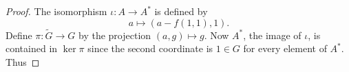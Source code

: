 \documentclass{dcthesis}
\newcommand{\mm}[1]{{\color{blue} \sf MM: [#1]}}
\newcommand{\wt}[1]{\widetilde{#1}}
\renewcommand{\ker}{\operatorname{ker}}
\numberwithin{equation}{section}
\theoremstyle{definition}
\theoremstyle{remark}
\begin{document}
{{{\begin{proof}
      The isomorphism $\iota\colon A\to A^*$
      is defined by
      \begin{equation}
        \label{eqn:iotaAstar}
        a\mapsto
        (a-f(1,1),1).
      \end{equation}
      Define $\pi\colon\wt{G}\to G$ by
      the projection
      $(a,g)\mapsto g$.
      Now $A^*$, the image of $\iota$,
      is contained in $\ker\pi$
      since the second coordinate is $1\in G$
      for every element of $A^*$.
      Thus

\end{proof}}}}
\end{document}
